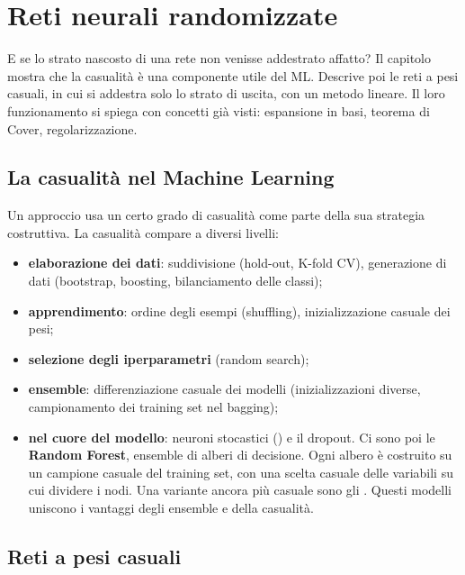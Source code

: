 \chapter{Reti neurali randomizzate}
\label{cap:random}

\begin{inbreve}
E se lo strato nascosto di una rete non venisse addestrato affatto? Il capitolo mostra che la casualità è una
componente utile del ML. Descrive poi le reti a pesi casuali, in cui si addestra solo lo strato di uscita, con un
metodo lineare. Il loro funzionamento si spiega con concetti già visti: espansione in basi, teorema di Cover,
regolarizzazione.
\end{inbreve}

\section{La casualità nel Machine Learning}

Un approccio  usa un certo grado di casualità come parte della sua strategia costruttiva. La
casualità compare a diversi livelli:
\begin{itemize}
  \item \textbf{elaborazione dei dati}: suddivisione (hold-out, K-fold CV), generazione di dati (bootstrap, boosting,
        bilanciamento delle classi);
  \item \textbf{apprendimento}: ordine degli esempi (shuffling), inizializzazione casuale dei pesi;
  \item \textbf{selezione degli iperparametri} (random search);
  \item \textbf{ensemble}: differenziazione casuale dei modelli (inizializzazioni diverse, campionamento dei training
        set nel bagging);
  \item \textbf{nel cuore del modello}: neuroni stocastici () e il dropout. Ci
        sono poi le \textbf{Random Forest}, ensemble di alberi di decisione. Ogni albero è costruito su un campione
        casuale del training set, con una scelta casuale delle variabili su cui dividere i nodi. Una variante ancora
        più casuale sono gli . Questi modelli uniscono i vantaggi degli ensemble e
        della casualità.
\end{itemize}

\section{Reti a pesi casuali}

